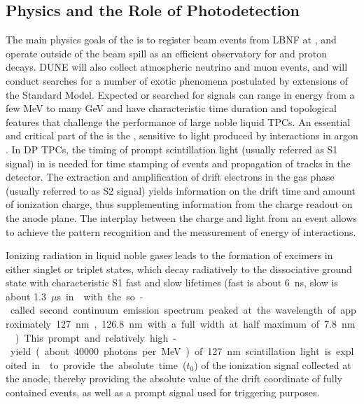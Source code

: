 \subsection{Physics and the Role of Photodetection}
\label{sec:fddp-pd-1.2}

The main physics goals of the  is to register beam events from LBNF at \fnal, and operate outside of the beam spill as an efficient observatory for  and proton decays. DUNE will also collect atmospheric neutrino and muon events, and will conduct searches for a number of exotic phenomena postulated by extensions of the Standard Model.  Expected or searched for signals can range in energy from a few MeV to many \si{GeV} and have characteristic time duration and topological features that challenge the performance of large noble liquid TPCs. An essential and critical part of the \lartpc is the , sensitive to light produced by interactions in argon \cite{Cuesta:2017nrs}. In DP TPCs, the timing of prompt scintillation light (usually referred as S1 signal) in \lar is needed for time stamping of events and propagation of tracks in the detector. The extraction and amplification of drift electrons in the gas phase (usually referred to as S2 signal) yields information on the drift time and amount of ionization charge, thus supplementing information from the charge readout on the anode plane. The interplay between the charge and light from an event allows to achieve the pattern recognition and the measurement of energy of interactions.

Ionizing radiation in liquid noble gases leads to the formation of excimers in either singlet or triplet states, which decay radiatively to the dissociative ground state with characteristic S1 fast and slow lifetimes (fast is about \SI{6}{ns}, slow is about \SI{1.3}{$\mu$s} in \lar with the so-called second continuum emission spectrum peaked at the wavelength of approximately \SI{127}{nm}, \SI{126.8}{nm} with a full width at half maximum of \SI{7.8}{nm} \cite{Heindl}). This prompt and relatively high-yield (about \num{40000} photons per \si{MeV}) of \SI{127}{nm} scintillation light is exploited in \lartpc to provide the absolute time ($t_0$) of the ionization signal collected at the anode, thereby providing the absolute value of the drift coordinate of fully contained events, as well as a prompt signal used for triggering purposes.

